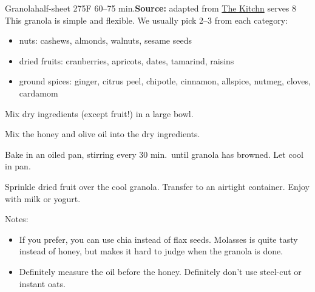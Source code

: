 \begin{recipe}{Granola}{half-sheet \hfill 275\0F \hfill 60--75 min.}{\textbf{Source:} adapted from \href{https://www.thekitchn.com/granola-recipe-258376}{The Kitchn} \hfill serves 8}
 \freeform This granola is simple and flexible. We usually pick 2--3 from each category:
 \begin{itemize}
  \item nuts: cashews, almonds, walnuts, sesame seeds
  \item dried fruits: cranberries, apricots, dates, tamarind, raisins
  \item ground spices: ginger, citrus peel, chipotle, cinnamon, allspice, nutmeg, cloves, cardamom
 \end{itemize}

 Mix dry ingredients (except fruit!) in a large bowl.

 Mix the honey and olive oil into the dry ingredients.

 \newstep Bake in an oiled pan, stirring every 30 min.\ until granola has browned. Let cool in pan.

 Sprinkle dried fruit over the cool granola. Transfer to an airtight container. Enjoy with milk or yogurt.

 \freeform Notes:
 \begin{itemize}
  \item If you prefer, you can use chia instead of flax seeds. Molasses is quite tasty instead of honey, but makes it hard to judge when the granola is done.
  \item Definitely measure the oil before the honey. Definitely don't use steel-cut or instant oats.
 \end{itemize}
\end{recipe}
